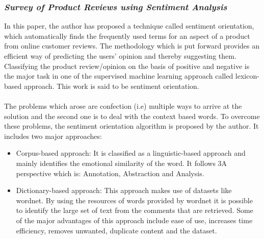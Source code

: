 \documentclass[conference]{IEEEtran}
\begin{document}
\subsubsection{\textit{Survey of Product Reviews using Sentiment Analysis\cite{b8}}}
In this paper, the author has proposed a technique called sentiment orientation, which automatically finds the frequently used terms for an aspect of a product from online customer reviews. The methodology which is put forward provides an efficient way of predicting the users' opinion and thereby suggesting them. Classifying the product review/opinion on the basis of positive and negative is the major task in one of the supervised machine learning approach called lexicon-based approach. This work is said to be sentiment orientation.\\\\
The problems which arose are confection (i.e) multiple ways to arrive at the solution and the second one is to deal with the context based words. To overcome these problems, the sentiment orientation algorithm is proposed by the author. It includes two major approaches:
\begin{itemize}
	\item Corpus-based approach: It is classified as a linguistic-based approach and mainly identifies the emotional similarity of the word. It follows 3A perspective which is: Annotation, Abstraction and Analysis.
	\item Dictionary-based approach: This approach makes use of datasets like wordnet. By using the resources of words provided by wordnet it is possible to identify the large set of text from the comments that are retrieved. Some of the major advantages of this approach include ease of use, increases time efficiency, removes unwanted, duplicate content and the dataset.
\end{itemize}
\end{document}
